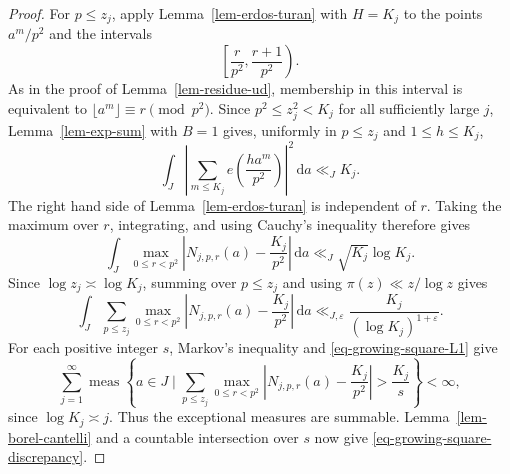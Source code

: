 \documentclass[11pt,reqno]{amsart}
\numberwithin{equation}{section}
\begin{document}
    \begin{proof}
        For $p\le z_j$, apply Lemma~\ref{lem-erdos-turan} with $H=K_j$ to the points $a^m/p^2$ and the intervals
        $$
        \left[\frac r{p^2},\frac{r+1}{p^2}\right).
        $$
        As in the proof of Lemma~\ref{lem-residue-ud}, membership in this interval is equivalent to $\lfloor a^m\rfloor\equiv r\pmod{p^2}$. Since $p^2\le z_j^2<K_j$ for all sufficiently large $j$, Lemma~\ref{lem-exp-sum} with $B=1$ gives, uniformly in $p\le z_j$ and $1\le h\le K_j$,
        $$
        \int_J
        \left|\sum_{m\le K_j}e\left(\frac{h a^m}{p^2}\right)\right|^2\,\mathrm{d}a
        \ll_J K_j.
        $$
        The right hand side of Lemma~\ref{lem-erdos-turan} is independent of $r$. Taking the maximum over $r$, integrating, and using Cauchy's inequality therefore gives
        $$
        \int_J
        \max_{0\le r<p^2}
        \left|N_{j,p,r}(a)-\frac{K_j}{p^2}\right|\,\mathrm{d}a
        \ll_J \sqrt{K_j}\log K_j.
        $$
        Since $\log z_j\asymp\log K_j$, summing over $p\le z_j$ and using $\pi(z)\ll z/\log z$ gives
        \begin{equation}\label{eq-growing-square-L1}
            \int_J
            \sum_{p\le z_j}
            \max_{0\le r<p^2}
            \left|N_{j,p,r}(a)-\frac{K_j}{p^2}\right|\,\mathrm{d}a
            \ll_{J,\varepsilon}
            \frac{K_j}{(\log K_j)^{1+\varepsilon}}.
        \end{equation}
        For each positive integer $s$, Markov's inequality and \eqref{eq-growing-square-L1} give
        $$
        \sum_{j=1}^{\infty}
        \operatorname{meas}\left\{a\in J\mid
        \sum_{p\le z_j}
        \max_{0\le r<p^2}
        \left|N_{j,p,r}(a)-\frac{K_j}{p^2}\right|>
        \frac{K_j}{s}\right\}<\infty,
        $$
        since $\log K_j\asymp j$. Thus the exceptional measures are summable. Lemma~\ref{lem-borel-cantelli} and a countable intersection over $s$ now give \eqref{eq-growing-square-discrepancy}.\qedhere
    \end{proof}
\end{document}
